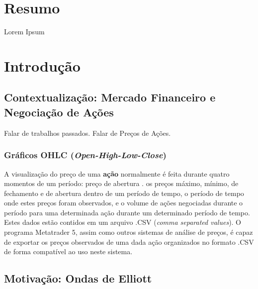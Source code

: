 \documentclass[12pt]{article}
\begin{document}
 

\nocite{ChromeV8,Node.js,NPM,ElectronJS}



\section{Resumo}

Lorem Ipsum

\newpage


\listoffigures
\listoftables

\newpage

\tableofcontents

\newpage

\section{Introdução}
\subsection{Contextualização: Mercado Financeiro e Negociação de Ações} \label{sec:Stockmarket}

Falar de trabalhos passados. Falar de Preços de Ações. 

\subsubsection{Gráficos OHLC (\textit{Open-High-Low-Close})} \label{sec:OHLC}

A visualização do preço de uma \textbf{ação} normalmente é feita durante quatro momentos
de um período: preço de abertura . os
preços máximo, mínimo, de fechamento e de abertura dentro de um período de tempo,
o período de tempo onde estes preços foram observados, e o volume de ações negociadas
durante o período para uma determinada ação durante um determinado período de tempo.
Estes dados estão contidos em um arquivo .CSV (\textit{comma separated values}).
O programa Metatrader 5, assim como outros sistemas de análise de preços, é capaz de
exportar os preços observados de uma dada ação organizados no formato .CSV de forma
compatível ao uso neste sistema.

\subsection{Motivação: Ondas de Elliott} \label{sec:Elliott-Waves}
\end{document}
